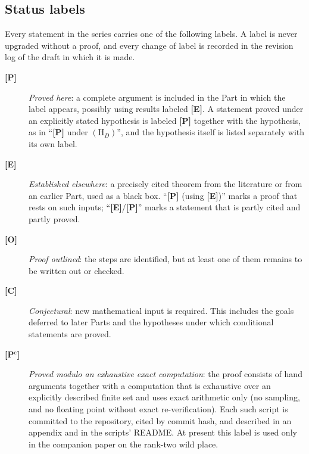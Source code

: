 \subsection{Status labels}\label{gl:labels}
Every statement in the series carries one of the following labels.
A label is never upgraded without a proof, and every change of label
is recorded in the revision log of the draft in which it is made.
\begin{description}
\item[\textbf{[P]}] \emph{Proved here}: a complete argument is
included in the Part in which the label appears, possibly using
results labeled \textbf{[E]}.  A statement proved under an
explicitly stated hypothesis is labeled \textbf{[P]} together with
the hypothesis, as in ``\textbf{[P]} under $(\mathrm H_D)$'', and the
hypothesis itself is listed separately with its own label.
\item[\textbf{[E]}] \emph{Established elsewhere}: a precisely cited
theorem from the literature or from an earlier Part, used as a black
box.  ``\textbf{[P]} (using \textbf{[E]})'' marks a proof that rests
on such inputs; ``\textbf{[E]}/\textbf{[P]}'' marks a statement that
is partly cited and partly proved.
\item[\textbf{[O]}] \emph{Proof outlined}: the steps are identified,
but at least one of them remains to be written out or checked.
\item[\textbf{[C]}] \emph{Conjectural}: new mathematical input is
required.  This includes the goals deferred to later Parts and the
hypotheses under which conditional statements are proved.
\item[\textbf{[P$^{\mathrm c}$]}] \emph{Proved modulo an exhaustive
exact computation}: the proof consists of hand arguments together
with a computation that is exhaustive over an explicitly described
finite set and uses exact arithmetic only (no sampling, and no
floating point without exact re-verification).  Each such script is
committed to the repository, cited by commit hash, and described in
an appendix and in the scripts' README.  At present this label is
used only in the companion paper on the rank-two wild place.
\end{description}

